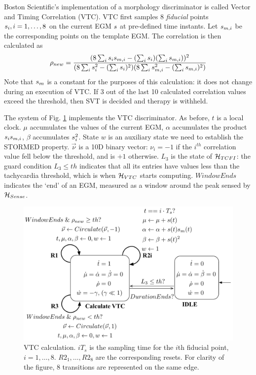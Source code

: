 Boston Scientific's implementation of a morphology discriminator is called Vector and Timing Correlation (VTC).
VTC first samples 8 \emph{fiducial} points $s_i,i=1,\ldots,8$ on the current \ac{EGM} $s$ at pre-defined time instants.
Let $s_{m,i}$ be the corresponding points on the template \ac{EGM}.
The correlation is then calculated as \cite{compass}
\[\rho_{new} = \frac{(8\sum_i s_i s_{m,i} - (\sum_i s_i)(\sum_i s_{m,i}))^2}{(8\sum_i s_i^2 - (\sum_i s_i)^2)(8\sum_i s_{m,i}^2 - (\sum_i s_{m,i})^2)} 
\]
Note that $s_m$ is a constant for the purposes of this calculation: it does not change during an execution of VTC. 
If 3 out of the last 10 calculated correlation values exceed the threshold, then \ac{SVT} is decided and therapy is withheld.

The system of Fig. \ref{fig:HVTC} implements the VTC discriminator.
As before, $t$ is a local clock.
$\mu$ accumulates the values of the current \ac{EGM}, $\alpha$ accumulates the product $s_i s_{m,i}$, 
$\beta$ accumulates $s_i^2$.
State $w$ is an auxiliary state we need to establish the STORMED property.
$\vec{\nu}$ is a 10D binary vector: $\nu_i = -1$ if the $i^{th}$ correlation value fell below the threshold, and is $+1$ otherwise.
$L_3$ is the state of $\mathcal{H}_{TCFI}$: the guard condition $L_3 \leq th$ indicates that all its entries have values less than the tachycardia threshold, which is when $\mathcal{H}_{VTC}$ starts computing.
$WindowEnds$ indicates the `end' of an \ac{EGM}, measured as a window around the peak sensed by $\mathcal{H}_{Sense}$.  
%
\begin{figure}[t]
\centering
\includegraphics[scale=0.325]{figures/VTC1v2}
\vspace{-10pt}
\caption{VTC calculation. $iT_s$ is the sampling time for the $i${th} fiducial point, $i=1,\ldots,8$. $R2_{1},\ldots,R2_{8}$ are the corresponding resets. For clarity of the figure, 8 transitions are represented on the same edge.}
\vspace{-10pt}
\label{fig:HVTC}
\end{figure}
